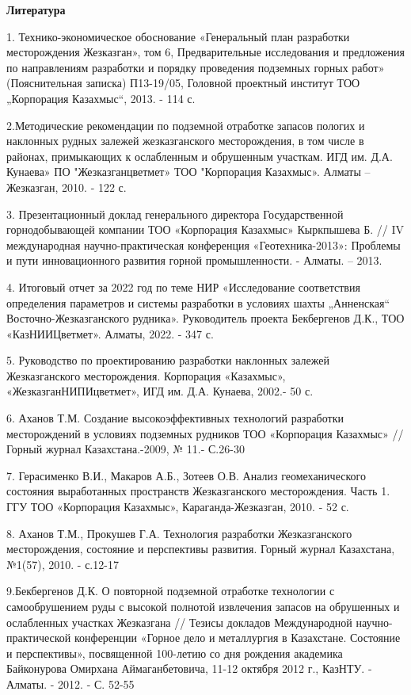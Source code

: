 \begin{center}
{\bfseries Литература}
\end{center}
\begin{references}
1. Технико-экономическое обоснование «Генеральный план разработки
месторождения Жезказган», том 6, Предварительные исследования и
предложения по направлениям разработки и порядку проведения подземных
горных работ» (Пояснительная записка) П13-19/05, Головной проектный
институт ТОО „Корпорация Казахмыс``, 2013. - 114 с.

2.Методические рекомендации по подземной отработке запасов пологих и
наклонных рудных залежей жезказганского месторождения, в том числе в
районах, примыкающих к ослабленным и обрушенным участкам. ИГД им. Д.А.
Кунаева» ПО "Жезказганцветмет» ТОО "Корпорация Казахмыс». Алматы --
Жезказган, 2010. - 122 с.

3. Презентационный доклад генерального директора Государственной
горнодобывающей компании ТОО «Корпорация Казахмыс» Кыркпышева Б. // IV
международная научно-практическая конференция «Геотехника-2013»:
Проблемы и пути инновационного развития горной промышленности. - Алматы.
-- 2013.

4. Итоговый отчет за 2022 год по теме НИР «Исследование соответствия
определения параметров и системы разработки в условиях шахты
„Анненская`` Восточно-Жезказганского рудника». Руководитель проекта
Бекбергенов Д.К., ТОО «КазНИИЦветмет». Алматы, 2022. - 347 с.

5. Руководство по проектированию разработки наклонных залежей
Жезказганского месторождения. Корпорация «Казахмыс»,
«ЖезказганНИПИцветмет», ИГД им. Д.А. Кунаева, 2002.- 50 с.

6. Аханов Т.М. Создание высокоэффективных технологий разработки
месторождений в условиях подземных рудников ТОО «Корпорация Казахмыс» //
Горный журнал Казахстана.-2009, № 11.- С.26-30

7. Герасименко В.И., Макаров А.Б., Зотеев О.В. Анализ геомеханического
состояния выработанных пространств Жезказганского месторождения. Часть
1. ГГУ ТОО «Корпорация Казахмыс», Караганда-Жезказган, 2010. - 52 с.

8. Аханов Т.М., Прокушев Г.А. Технология разработки Жезказганского
месторождения, состояние и перспективы развития. Горный журнал
Казахстана, №1(57), 2010. - с.12-17

9.Бекбергенов Д.К. О повторной подземной отработке технологии с
самообрушением руды с высокой полнотой извлечения запасов на обрушенных
и ослабленных участках Жезказгана // Тезисы докладов Международной
научно-практической конференции «Горное дело и металлургия в Казахстане.
Состояние и перспективы», посвященной 100-летию со дня рождения
академика Байконурова Омирхана Аймаганбетовича, 11-12 октября 2012 г.,
КазНТУ. - Алматы. - 2012. - С. 52-55


\end{references}
